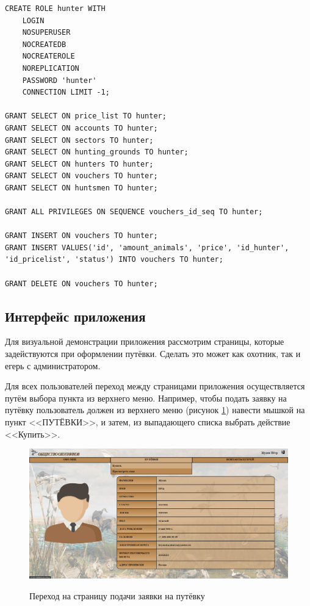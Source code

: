 		\begin{lstlisting}[caption = {Создание hunter и задание прав}, label=lst:create_rights_hunter]
CREATE ROLE hunter WITH
	LOGIN
	NOSUPERUSER
	NOCREATEDB
	NOCREATEROLE
	NOREPLICATION
	PASSWORD 'hunter'
	CONNECTION LIMIT -1;
	
GRANT SELECT ON price_list TO hunter;
GRANT SELECT ON accounts TO hunter;
GRANT SELECT ON sectors TO hunter;
GRANT SELECT ON hunting_grounds TO hunter;
GRANT SELECT ON hunters TO hunter;
GRANT SELECT ON vouchers TO hunter;
GRANT SELECT ON huntsmen TO hunter;

GRANT ALL PRIVILEGES ON SEQUENCE vouchers_id_seq TO hunter;

GRANT INSERT ON vouchers TO hunter;
GRANT INSERT VALUES('id', 'amount_animals', 'price', 'id_hunter', 'id_pricelist', 'status') INTO vouchers TO hunter;

GRANT DELETE ON vouchers TO hunter;
		\end{lstlisting}
		
	\subsection{Интерфейс приложения}
	Для визуальной демонстрации приложения рассмотрим страницы, которые задействуются при оформлении путёвки. Сделать это может как охотник, так и егерь с администратором. 
	
	
	Для всех пользователей переход между страницами приложения осуществляется путём выбора пункта из верхнего меню. Например, чтобы подать заявку на путёвку пользователь должен из верхнего меню (рисунок \ref{fig10:image}) навести мышкой на пункт <<ПУТЁВКИ>>, и затем, из выпадающего списка выбрать действие <<Купить>>.
	
	\begin{figure}[h]
		\centering
		\begin{center}
			{\includegraphics[scale=0.34]{schemes/screens/start.png}}
			\caption{Переход на страницу подачи заявки на путёвку}
			\label{fig10:image}
		\end{center}
	\end{figure}

